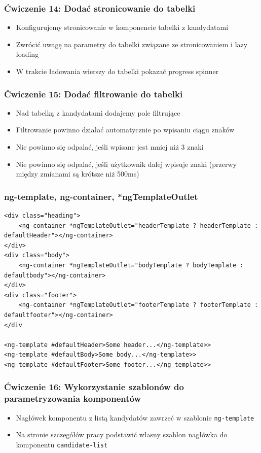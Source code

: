 \documentclass{beamer}
\begin{document}
\begin{frame}
    \frametitle{Ćwiczenie 14: Dodać stronicowanie do tabelki}
    \begin{itemize}
        \item Konfigurujemy stronicowanie w komponencie tabelki z kandydatami
        \item Zwrócić uwagę na parametry do tabelki związane ze stronicowaniem i lazy loading
        \item W trakcie ładowania wierszy do tabelki pokazać progress spinner
    \end{itemize}
\end{frame}

\begin{frame}
    \frametitle{Ćwiczenie 15: Dodać filtrowanie do tabelki}
    \begin{itemize}
        \item Nad tabelką z kandydatami dodajemy pole filtrujące
        \item Filtrowanie powinno działać automatycznie po wpisaniu ciągu znaków
        \item Nie powinno się odpalać, jeśli wpisane jest mniej niż 3 znaki
        \item Nie powinno się odpalać, jeśli użytkownik dalej wpisuje znaki (przerwy między zmianami są krótsze niż 500ms)
    \end{itemize}
\end{frame}

\begin{frame}[fragile]
    \frametitle{ng-template, ng-container, *ngTemplateOutlet}
\begin{lstlisting}
<div class="heading">
    <ng-container *ngTemplateOutlet="headerTemplate ? headerTemplate : defaultHeader"></ng-container>
</div>
<div class="body">
    <ng-container *ngTemplateOutlet="bodyTemplate ? bodyTemplate : defaultbody"></ng-container>
</div>
<div class="footer">
    <ng-container *ngTemplateOutlet="footerTemplate ? footerTemplate : defaultfooter"></ng-container>
</div

<ng-template #defaultHeader>Some header...</ng-template>>
<ng-template #defaultBody>Some body...</ng-template>>
<ng-template #defaultFooter>Some footer...</ng-template>>
\end{lstlisting}
\end{frame}

\begin{frame}
    \frametitle{Ćwiczenie 16: Wykorzystanie szablonów do parametryzowania komponentów}
    \begin{itemize}
        \item Nagłówek komponentu z listą kandydatów zawrzeć w szablonie \lstinline{ng-template}
        \item Na stronie szczegółów pracy podstawić własny szablon nagłówka do komponentu \lstinline{candidate-list}
    \end{itemize}
\end{frame}
\end{document}
